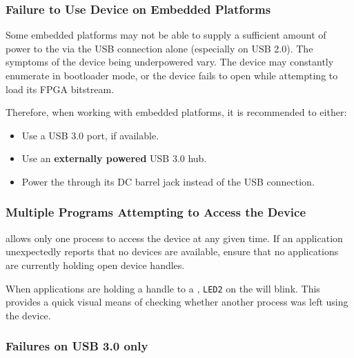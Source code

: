 \subsubsection{Failure to Use Device on Embedded Platforms}

Some embedded platforms may not be able to supply a sufficient amount of
power to the \bladerf via the USB connection alone (especially on USB 2.0). The
symptoms of the device being underpowered vary. The device may
constantly enumerate in bootloader mode, or the device fails to open while
attempting to load its FPGA bitstream.

Therefore, when working with embedded platforms, it is recommended to either:
\begin{itemize}
    \item Use a USB 3.0 port, if available.
    \item Use an \textbf{externally powered} USB 3.0 hub.
    \item Power the \bladerf through its DC barrel jack instead of the USB connection.
\end{itemize}

\subsubsection{Multiple Programs Attempting to Access the Device}

\libbladerf allows only one process to access the device at any given time. If
an application unexpectedly reports that no \bladerf devices are available, ensure
that no applications are currently holding open device handles.

When applications are holding a handle to a \bladerf, \texttt{LED2} on the
\bladerf will blink. This provides a quick visual means of checking whether
another process was left using the device.

\subsubsection{Failures on USB 3.0 only}

